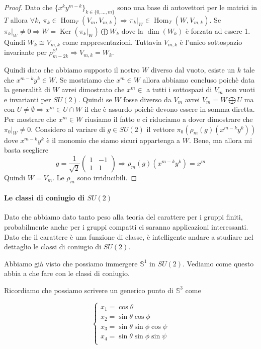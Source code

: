 \documentclass[11pt]{article}
\theoremstyle{plain}
\theoremstyle{definition}
\theoremstyle{remark}
\DeclareMathOperator{\Hom}{Hom}
\DeclareMathOperator{\Ker}{Ker}
\begin{document}
\begin{proof}
Dato che  $\{ x^ky^{m-k} \}_{k \in \{0, ..., m\}}$ sono una base di autovettori per le matrici in $T$ allora $\forall k,\ \pi_k\in \Hom_T(V_m,V_{m,k} )\Rightarrow \pi_k|_W\in \Hom_T(W,V_{m,k})$. Se $\pi_k|_W\neq 0\Rightarrow W=\Ker(\pi_k|_W)\bigoplus W_k$ dove la $\dim(W_k)$ è forzata ad essere 1. Quindi $W_k\cong V_{m,k}$ come rappresentazioni. Tuttavia $V_{m,k}$ è l'unico sottospazio invariante per $\rho_{m-2k}^{\mathbb{S}^1}\Rightarrow V_{m,k}=W_k$.


Quindi dato che abbiamo supposto il nostro $W$ diverso dal vuoto, esiste un $k$ tale che $x^{m-k}y^k\in W$. Se mostriamo che $x^m\in W$ allora abbiamo concluso poichè data la generalità di $W$ avrei dimostrato che $x^m\in$ a tutti i sottospazi di $V_m$ non vuoti e invarianti per $SU(2)$. Quindi se $W$ fosse diverso da $V_m$ avrei $V_m=W\bigoplus U$ ma con $U\neq \emptyset \Rightarrow x^m\in U\cap W$ il che è assurdo poichè devono essere in somma diretta. Per mostrare che $x^m\in W$ riusiamo il fatto e ci riduciamo a dover dimostrare che $\pi_0|_W\neq 0$. Considero al variare di $g\in SU(2)$ il vettore $\pi_0(\rho_m(g)(x^{m-k}y^k))$ dove $x^{m-k}y^k$ è il monomio che siamo sicuri appartenga a $W$. Bene, ma allora mi basta scegliere
\[g=\frac{1}{\sqrt{2}}\begin{pmatrix}
1& -1\\ 
 1& 1
\end{pmatrix}\Rightarrow \rho_m(g)(x^{m-k}y^k)=x^m\]
Quindi $W=V_m$. Le $\rho_m$ sono irriducibili.
\end{proof}




 \paragraph{Le classi di coniugio di $SU(2)$}
 Dato che abbiamo dato tanto peso alla teoria del carattere per i gruppi finiti, probabilmente anche per i gruppi compatti ci saranno applicazioni interessanti. Dato che il carattere è una funzione di classe, è intelligente andare a studiare nel dettaglio le classi di coniugio di $SU(2)$.


 Abbiamo già visto che possiamo immergere $\mathbb{S}^1$ in $SU(2)$. Vediamo come questo abbia a che fare con le classi di coniugio.


 Ricordiamo che possiamo scrivere un generico punto di $\mathbb{S}^3$ come

 \[
 \begin{cases}
 x_1 = \cos\theta \\
 x_2 = \sin\theta\cos\phi \\
 x_3 = \sin\theta\sin\phi\cos\psi \\
 x_4 = \sin\theta\sin\phi\sin\psi \\
 \end{cases}
 \]
\end{document}
